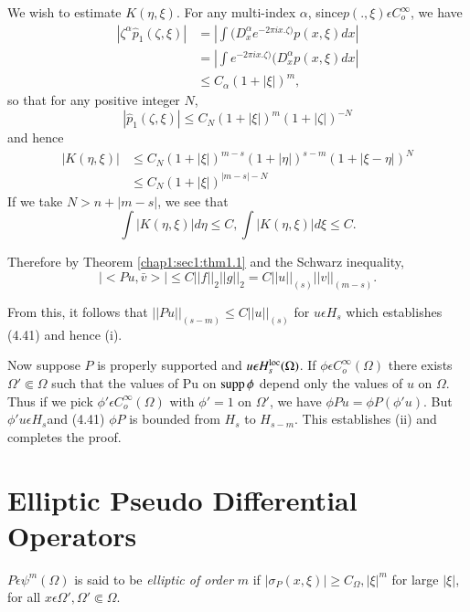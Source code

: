 We wish to estimate $K(\eta, \xi)$. For any multi-index $\alpha$,
since\break $p(., \xi) \epsilon C^{\infty}_o$, we have  
\begin{align*}
  |\zeta^{\alpha} \hat{p}_1(\zeta, \xi)| & = | \int (D^{\alpha}_x e^{-2
    \pi i x. \zeta)} p( x, \xi)dx | \\ 
  & = | \int  e^{-2 \pi i x. \zeta)} (D^{\alpha}_x p( x, \xi)dx| \\
  & \leq C_{\alpha}(1+ |\xi| )^m,
\end{align*}
so that for any positive integer $N$,
$$
|\hat{p}_1 (\zeta, \xi)| \leq C_N(1+ | \xi |)^m (1+ | \zeta|)^{-N}
$$
and hence
\begin{align*}
  | K(\eta, \xi)| & \leq C_N(1+ | \xi |)^{m-s}(1+ | \eta|)^{s-m}(1+|\xi -
  \eta|)^{N} \\ 
  & \leq C_N(1+ | \xi |)^{|m-s|-N}
\end{align*} 
If we take $N> n+ |m-s|$, we see that 
$$
\int | K(\eta, \xi)| d \eta \leq C, \int |K(\eta,  \xi)| d \xi \leq C.
$$

Therefore by Theorem \ref{chap1:sec1:thm1.1} and the Schwarz inequality,
$$
| < Pu, \bar{v}> | \leq C|| f||_2 ||g||_2 = C|| u||_{(s)} ||v||_{(m-s)}.
$$

From this, it follows that $||Pu||_{(s-m)} \leq C||u||_{(s)}$ for $u
\epsilon H_s$ which establishes (4.41) and hence (i). 

Now suppose $P$ is properly supported and $u \epsilon H^{\operatorname{loc}}_s
(\Omega)$. If $\phi \epsilon C^{\infty}_o (\Omega)$ there exists
$\Omega' \Subset \Omega$ such that the values of Pu on $\operatorname{supp} \phi$
depend only the values of $u$ on $\Omega$. Thus if we pick $\phi'
\epsilon C^{\infty}_o (\Omega)$ with $\phi' = 1$ on $\Omega'$, we
have $\phi Pu = \phi P(\phi 'u)$. But $\phi' u \epsilon H_s$\pageoriginale and
(4.41) $\phi P$ is bounded from $H_s$ to $H_{s-m}$. This establishes (ii)
and completes the proof. 

\section{Elliptic Pseudo Differential Operators}\label{chap4:sec8}%

\setcounter{defi}{41}
\begin{defi}\label{chap4:sec8:def4.42}%
  $P \epsilon \psi^m (\Omega)$ is said to be \textit{ elliptic of
    order } $ m$ if $| \sigma_P (x, \xi)| \geq C_{\Omega}, |\xi|^m$
  for large $|\xi|$, for all $x \epsilon \Omega', \Omega' \Subset
  \Omega$. 
\end{defi}

